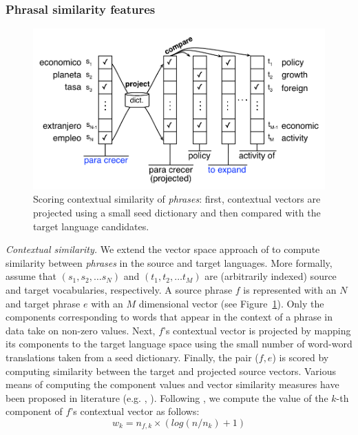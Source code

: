 \documentclass[11pt]{article}
\newcommand{\figref}[1]{Figure~\ref{#1}}
\newcommand{\paraheader}[1]{\vskip 0.05in \noindent\emph{#1}}
\begin{document}
\subsubsection{Phrasal similarity features} \label{sect:phrasalfeats}

\begin{figure}[t]
\includegraphics[width=\linewidth]{../figures/contextual/contextual}
\caption{Scoring contextual similarity of \emph{phrases}: first, contextual vectors are projected using a small seed dictionary and then compared with the target language candidates.}
\label{fig:contextual}
\end{figure}

\paraheader{Contextual similarity.}  We extend the vector space approach of  to compute similarity between \emph{phrases} in the source and target languages.  More formally, assume that $(s_{1}, s_{2}, \dots s_{N})$ and $(t_{1}, t_{2}, \dots t_{M})$ are (arbitrarily indexed) source and target vocabularies, respectively.  A source phrase $f$ is represented with an $N$ and target phrase $e$ with an $M$ dimensional vector (see \figref{fig:contextual}).  Only the components corresponding to words that appear in the context of a phrase in data take on non-zero values. Next, $f$'s contextual vector is projected by mapping its components to the target language space using the small number of word-word translations taken from a seed dictionary.
Finally, the pair ($f, e$) is scored by computing similarity between the target  and projected source vectors.  Various means of computing the component values and vector similarity measures have been proposed in literature (e.g. , ).  Following , we compute the value of the $k$-th component of $f$'s contextual vector  as follows: 
\begin{equation*}
w_{k} = n_{f,k} \times (log( {n / n_{k}}) + 1)
\end{equation*}
\end{document}

